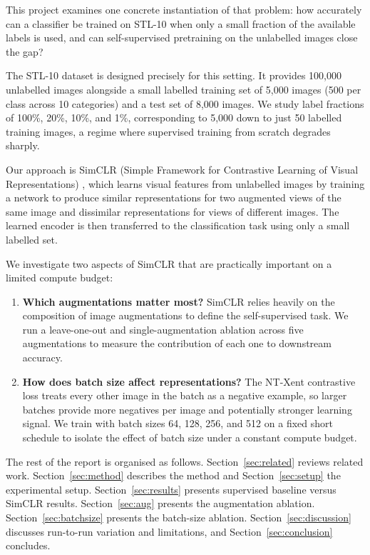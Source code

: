\documentclass[twoside,a4paper,11pt]{article}
\begin{document}
This project examines one concrete instantiation of that problem: how accurately can a
classifier be trained on STL-10 when only a small fraction of the available labels is
used, and can self-supervised pretraining on the unlabelled images close the gap?

The STL-10 dataset \cite{coates2011stl10} is designed precisely for this setting. It
provides 100,000 unlabelled images alongside a small labelled training set of 5,000
images (500 per class across 10 categories) and a test set of 8,000 images. We study
label fractions of 100\%, 20\%, 10\%, and 1\%, corresponding to 5,000 down to just 50
labelled training images, a regime where supervised training from scratch degrades
sharply.

Our approach is SimCLR (Simple Framework for Contrastive Learning of Visual
Representations) \cite{chen2020simclr}, which learns visual features from unlabelled
images by training a network to produce similar representations for two augmented views
of the same image and dissimilar representations for views of different images. The
learned encoder is then transferred to the classification task using only a small
labelled set.

We investigate two aspects of SimCLR that are practically important on a limited
compute budget:

\begin{enumerate}
  \item \textbf{Which augmentations matter most?} SimCLR relies heavily on the
  composition of image augmentations to define the self-supervised task. We run a
  leave-one-out and single-augmentation ablation across five augmentations to measure
  the contribution of each one to downstream accuracy.

  \item \textbf{How does batch size affect representations?} The NT-Xent contrastive
  loss treats every other image in the batch as a negative example, so larger batches
  provide more negatives per image and potentially stronger learning signal. We train
  with batch sizes 64, 128, 256, and 512 on a fixed short schedule to isolate the
  effect of batch size under a constant compute budget.
\end{enumerate}

The rest of the report is organised as follows. Section~\ref{sec:related} reviews
related work. Section~\ref{sec:method} describes the method and
Section~\ref{sec:setup} the experimental setup.
Section~\ref{sec:results} presents supervised baseline versus SimCLR results.
Section~\ref{sec:aug} presents the augmentation ablation.
Section~\ref{sec:batchsize} presents the batch-size ablation.
Section~\ref{sec:discussion} discusses run-to-run variation and limitations, and
Section~\ref{sec:conclusion} concludes.
\end{document}
